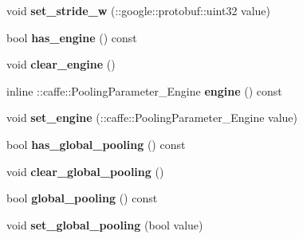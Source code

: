 \begin{DoxyCompactItemize}
void {\bfseries set\+\_\+stride\+\_\+w} (\+::google\+::protobuf\+::uint32 value)
\item 
\mbox{\label{classcaffe_1_1_pooling_parameter_a957e65f1558735dba38ba600ffdbb8dd}} 
bool {\bfseries has\+\_\+engine} () const
\item 
\mbox{\label{classcaffe_1_1_pooling_parameter_abddb896edc23e84abaef1697026e5b5a}} 
void {\bfseries clear\+\_\+engine} ()
\item 
\mbox{\label{classcaffe_1_1_pooling_parameter_a3d20c909b07e83f39c19e54ae6a57741}} 
inline \+::caffe\+::\+Pooling\+Parameter\+\_\+\+Engine {\bfseries engine} () const
\item 
\mbox{\label{classcaffe_1_1_pooling_parameter_a38322446a8bcb65324d46d47160834dd}} 
void {\bfseries set\+\_\+engine} (\+::caffe\+::\+Pooling\+Parameter\+\_\+\+Engine value)
\item 
\mbox{\label{classcaffe_1_1_pooling_parameter_ad1c3589e2f4da6ecb2456ab66592ec24}} 
bool {\bfseries has\+\_\+global\+\_\+pooling} () const
\item 
\mbox{\label{classcaffe_1_1_pooling_parameter_ae18934533638b102d7b87796f73307a3}} 
void {\bfseries clear\+\_\+global\+\_\+pooling} ()
\item 
\mbox{\label{classcaffe_1_1_pooling_parameter_ac3387e6729a74f75af2c61c7a17bed3d}} 
bool {\bfseries global\+\_\+pooling} () const
\item 
\mbox{\label{classcaffe_1_1_pooling_parameter_acbf8f80344dcb6a7337c9dd9f6c40212}} 
void {\bfseries set\+\_\+global\+\_\+pooling} (bool value)
\end{DoxyCompactItemize}
